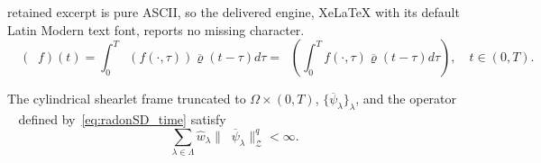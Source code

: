 \documentclass[10pt,a4paper]{amsart}
\DeclareMathOperator{\cradonSD}{\mathscr{R}^{\text{sd}}}
\DeclareMathOperator{\radonSD}{\mathcal{R}^{\text{sd}}}
\begin{document}
retained excerpt is pure ASCII, so the delivered engine, XeLaTeX with its default Latin Modern text font, reports no missing character.
\begin{equation}
    \label{eq:radonSD_time}
    \quad (\cradonSD f)(t) = \int_0^T \radonSD(f(\cdot,\tau))\overline{\varrho}(t-\tau) d\tau = \radonSD \left(\int_0^T f(\cdot,\tau)\overline{\varrho}(t-\tau) d\tau \right), \quad t \in (0,T).
\end{equation}

\begin{lemma}
\label{lem:Apsi}
The cylindrical shearlet frame truncated to $\Omega \times (0,T)$, $\{\overline{\psi}_\lambda \}_\lambda$, and the operator $\cradonSD$ defined by~\eqref{eq:radonSD_time} satisfy
    \begin{equation}
    \sum_{\lambda \in \Lambda} \hat{w}_\lambda \| \cradonSD \overline{\psi}_\lambda \|_\mathcal{Z}^q < \infty.
        \label{eq:Aframe_inf}
    \end{equation}
\end{lemma}
\end{document}
